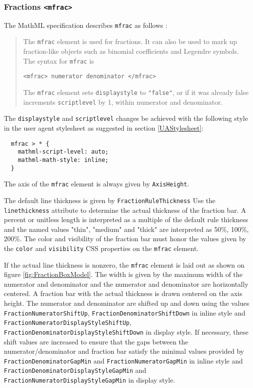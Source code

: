 \subsubsection{Fractions {\tt <mfrac>}}\label{Fractions}

The MathML specification describes {\tt mfrac} as follows \cite{MathML3}:
%
\begin{quote}
The {\tt mfrac} element is used for fractions. It can also be used to mark up
fraction-like objects such as binomial coefficients and Legendre symbols.
The syntax for {\tt mfrac} is

  {\tt <mfrac> numerator denominator </mfrac>}

The {\tt mfrac} element sets {\tt displaystyle} to {\tt "false"}, or if it was
already false increments {\tt scriptlevel} by 1, within numerator and
denominator.
\end{quote}

The {\tt displaystyle} and {\tt scriptlevel} changes be achieved with the
following style in the user agent stylesheet as suggested in section
\ref{UAStylesheet}:
%
\begin{lstlisting}
  mfrac > * {
    mathml-script-level: auto;
    mathml-math-style: inline;
  }
\end{lstlisting}
%

The axis of the {\tt mfrac} element is always given by
{\tt AxisHeight}.

The default line thickness is given by
{\tt FractionRuleThickness}
Use the {\tt linethickness} attribute \cite{MathML3} to determine the
actual thickness of the fraction bar. A percent or unitless length is
interpreted as a multiple of the default rule thickness and
the named values "thin", "medium" and "thick" are interpreted as
50\%, 100\%, 200\%.
The color and visibility of the fraction bar must honor the values given by the
{\tt color} and {\tt visibility} CSS properties on the {\tt mfrac} element.

If the actual line thickness is nonzero, the {\tt mfrac} element is laid out as
shown on figure \ref{fig:FractionBoxModel}.
The width is given by the maximum width of the
numerator and denominator and the numerator and denominator are horizontally
centered. A fraction bar with the actual thickness is drawn centered on the
axis height. The numerator and denominator are shifted
up and down using the values {\tt FractionNumeratorShiftUp},
{\tt FractionDenominatorShiftDown} in inline style and
{\tt FractionNumeratorDisplayStyleShiftUp},
{\tt FractionDenominatorDisplayStyleShiftDown}
in display style.
If necessary, these shift values are increased to ensure that the gaps between
the numerator/denominator and fraction bar satisfy the minimal values provided
by {\tt FractionDenominatorGapMin} and
{\tt FractionNumeratorGapMin} in inline style and
{\tt FractionDenominatorDisplayStyleGapMin} and
{\tt FractionNumeratorDisplayStyleGapMin}
in display style.

